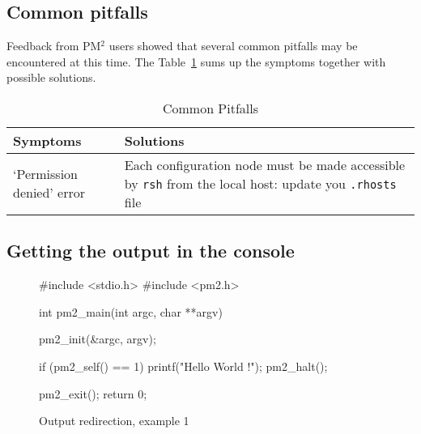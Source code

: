 \documentclass[a4paper,11pt]{report}
\def\pm2{PM$^2$\xspace}
\begin{document}
\subsection{Common pitfalls}
Feedback from \pm2 users showed that several common pitfalls may be
encountered at this time. The Table~\ref{tbl:pitfalls} sums up the
symptoms together with possible solutions.
\begin{table}
\caption{Common Pitfalls\label{tbl:pitfalls}}
\begin{center}
\begin{tabular}[p]{|p{5cm}|p{7cm}|}                             \hline
Symptoms                       & Solutions                    \\ \hline
`Permission denied' error      & Each configuration node must be made
accessible by \texttt{rsh} from the local host: update you
\texttt{.rhosts} file                                         \\ \hline
\end{tabular}
\end{center}
\end{table}

\subsection{Getting the output in the console}
\begin{figure}[p]
\begin{center}
\begin{boxedminipage}{0.8\textwidth}
\begin{footnotesize}
\begin{listing}{0}
 #include <stdio.h>
 #include <pm2.h>

 int pm2_main(int argc, char **argv)
 {
   pm2_init(&argc, argv);

   if (pm2_self() == 1)
     {
       printf("Hello World !\n");    
       pm2_halt();
     }
  
   pm2_exit();
   return 0;
 }
\end{listing}
\end{footnotesize}
\end{boxedminipage}
\end{center}
\caption{Output redirection, example 1\label{fig:ex2-1}}
\end{figure}
\end{document}
